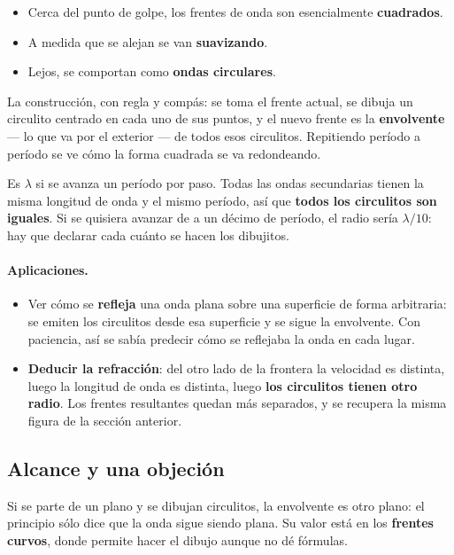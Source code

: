 \documentclass[12pt,a4paper]{article}
\begin{document}
\begin{itemize}
  \item Cerca del punto de golpe, los frentes de onda son esencialmente
        \textbf{cuadrados}.
  \item A medida que se alejan se van \textbf{suavizando}.
  \item Lejos, se comportan como \textbf{ondas circulares}.
\end{itemize}

La construcción, con regla y compás: se toma el frente actual, se dibuja un
circulito centrado en cada uno de sus puntos, y el nuevo frente es la
\textbf{envolvente} --- lo que va por el exterior --- de todos esos circulitos.
Repitiendo período a período se ve cómo la forma cuadrada se va redondeando.

\begin{notebox}
Es $\lambda$ si se avanza un período por paso. Todas las ondas secundarias tienen
la misma longitud de onda y el mismo período, así que \textbf{todos los
circulitos son iguales}. Si se quisiera avanzar de a un décimo de período, el
radio sería $\lambda/10$: hay que declarar cada cuánto se hacen los dibujitos.
\end{notebox}

\paragraph{Aplicaciones.}
\begin{itemize}
  \item Ver cómo se \textbf{refleja} una onda plana sobre una superficie de forma
        arbitraria: se emiten los circulitos desde esa superficie y se sigue la
        envolvente. Con paciencia, así se sabía predecir cómo se reflejaba la
        onda en cada lugar.
  \item \textbf{Deducir la refracción}: del otro lado de la frontera la velocidad
        es distinta, luego la longitud de onda es distinta, luego \textbf{los
        circulitos tienen otro radio}. Los frentes resultantes quedan más
        separados, y se recupera la misma figura de la sección anterior.
\end{itemize}

\subsection{Alcance y una objeción}

\begin{notebox}
Si se parte de un plano y se dibujan circulitos, la envolvente es otro plano: el
principio sólo dice que la onda sigue siendo plana. Su valor está en los
\textbf{frentes curvos}, donde permite hacer el dibujo aunque no dé fórmulas.
\end{notebox}
\end{document}
